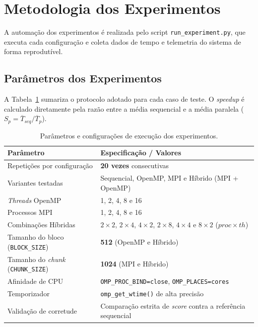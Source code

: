 \section{Metodologia dos Experimentos}

A automação dos experimentos é realizada pelo script \texttt{run\_experiment.py}, que executa cada configuração e coleta dados de tempo e telemetria do sistema de forma reprodutível.

\subsection{Parâmetros dos Experimentos}

A Tabela~\ref{tab:param_experimento} sumariza o protocolo adotado para cada caso de teste. O \textit{speedup} é calculado diretamente pela razão entre a média sequencial e a média paralela ($S_p = \overline{T}_{seq} / \overline{T}_p$).

\begin{table}[H]
\centering
\caption{Parâmetros e configurações de execução dos experimentos.}
\label{tab:param_experimento}
\begin{tabular}{@{}ll@{}}
\toprule
Parâmetro & Especificação / Valores \\ \midrule
Repetições por configuração & \textbf{20 vezes} consecutivas \\
Variantes testadas & Sequencial, OpenMP, MPI e Híbrido (MPI + OpenMP) \\
\textit{Threads} OpenMP & 1, 2, 4, 8 e 16 \\
Processos MPI & 1, 2, 4, 8 e 16 \\
Combinações Híbridas & $2\times2$, $2\times4$, $4\times2$, $2\times8$, $4\times4$ e $8\times2$ ($proc \times th$) \\
Tamanho do bloco (\texttt{BLOCK\_SIZE}) & \textbf{512} (OpenMP e Híbrido) \\
Tamanho do \textit{chunk} (\texttt{CHUNK\_SIZE}) & \textbf{1024} (MPI e Híbrido) \\
Afinidade de CPU & \texttt{OMP\_PROC\_BIND=close}, \texttt{OMP\_PLACES=cores} \\
Temporizador & \texttt{omp\_get\_wtime()} de alta precisão \\
Validação de corretude & Comparação estrita de \textit{score} contra a referência sequencial \\ \bottomrule
\end{tabular}
\end{table}

